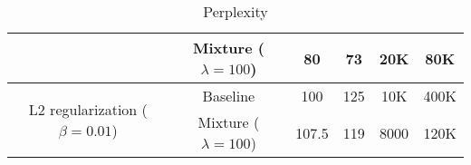 \begin{table}[]
\begin{tabular}{cc|c|c|c|c|}
		\multicolumn{1}{|c|}{}                                                  & Mixture ($\lambda=100$) & 80          & 73         & 20K          & 80K         \\ \hline
		\multicolumn{1}{|c|}{\multirow{2}{*}{L2 regularization ($\beta=0.01$)}} & Baseline                & 100         & 125        & 10K          & 400K        \\ \cline{2-6} 
		\multicolumn{1}{|c|}{}                                                  & Mixture ($\lambda=100$) & 107.5       & 119        & 8000         & 120K        \\ \hline
	\end{tabular}
	\caption{Perplexity}
	\label{my-label}
\end{table}